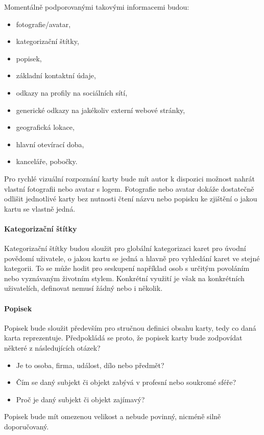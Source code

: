 	Momentálně podporovanými takovými informacemi budou:
	\begin{itemize}
		\item fotografie/avatar,
		\item kategorizační štítky,
		\item popisek,
		\item základní kontaktní údaje,
		\item odkazy na profily na sociálních sítí,
		\item generické odkazy na jakékoliv externí webové stránky,
		\item geografická lokace,
		\item hlavní otevírací doba,
		\item kanceláře, pobočky.
	\end{itemize}

	Pro rychlé vizuální rozpoznání karty bude mít autor k dispozici možnost nahrát vlastní fotografii nebo avatar s logem.
	Fotografie nebo avatar dokáže dostatečně odlišit jednotlivé karty bez nutnosti čtení názvu nebo popisku ke zjištění o
	jakou kartu se vlastně jedná.

	\paragraph{Kategorizační štítky}

	Kategorizační štítky budou sloužit pro globální kategorizaci karet pro úvodní povědomí uživatele, o jakou kartu se jedná
	a hlavně pro vyhledání karet ve stejné kategorii.
	To se může hodit pro seskupení například osob s určitým povoláním nebo vyznávaným životním stylem.
	Konkrétní využití je však na konkrétních uživatelích, definovat nemusí žádný nebo i několik.

	\paragraph{Popisek}

	Popisek bude sloužit především pro stručnou definici obsahu karty, tedy co daná karta reprezentuje.
	Předpokládá se proto, že popisek karty bude zodpovídat některé z následujících otázek?
	\begin{itemize}
		\item Je to osoba, firma, událost, dílo nebo předmět?
		\item Čím se daný subjekt či objekt zabývá v profesní nebo soukromé sféře?
		\item Proč je daný subjekt či objekt zajímavý?
	\end{itemize}
	Popisek bude mít omezenou velikost a nebude povinný, nicméně silně doporučovaný.

